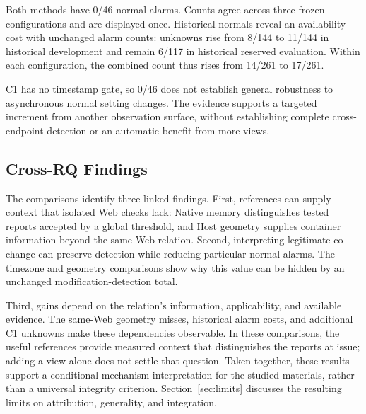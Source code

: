 Both methods have 0/46 normal alarms. Counts agree across three frozen configurations and are displayed once. Historical normals reveal an availability cost with unchanged alarm counts: unknowns rise from 8/144 to 11/144 in historical development and remain 6/117 in historical reserved evaluation. Within each configuration, the combined count thus rises from 14/261 to 17/261.

C1 has no timestamp gate, so 0/46 does not establish general robustness to asynchronous normal setting changes. The evidence supports a targeted increment from another observation surface, without establishing complete cross-endpoint detection or an automatic benefit from more views.

\subsection{Cross-RQ Findings}
The comparisons identify three linked findings. First, references can supply context that isolated Web checks lack: Native memory distinguishes tested reports accepted by a global threshold, and Host geometry supplies container information beyond the same-Web relation. Second, interpreting legitimate co-change can preserve detection while reducing particular normal alarms. The timezone and geometry comparisons show why this value can be hidden by an unchanged modification-detection total.

Third, gains depend on the relation's information, applicability, and available evidence. The same-Web geometry misses, historical alarm costs, and additional C1 unknowns make these dependencies observable. In these comparisons, the useful references provide measured context that distinguishes the reports at issue; adding a view alone does not settle that question. Taken together, these results support a conditional mechanism interpretation for the studied materials, rather than a universal integrity criterion. Section~\ref{sec:limits} discusses the resulting limits on attribution, generality, and integration.
